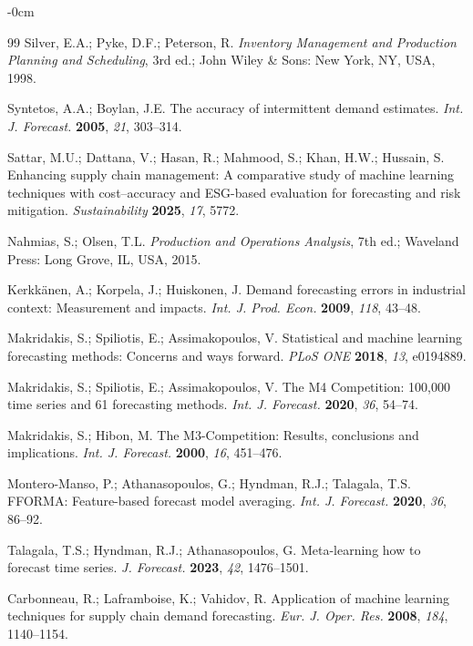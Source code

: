 \documentclass[forecasting,article,submit,pdftex,moreauthors]{Definitions/mdpi}
\begin{document}
\begin{adjustwidth}{-\extralength}{0cm}
\begin{thebibliography}{99}
Silver, E.A.; Pyke, D.F.; Peterson, R. \textit{Inventory Management and Production Planning and Scheduling}, 3rd ed.; John Wiley \& Sons: New York, NY, USA, 1998.

Syntetos, A.A.; Boylan, J.E. The accuracy of intermittent demand estimates. \textit{Int. J. Forecast.} \textbf{2005}, \textit{21}, 303--314.

Sattar, M.U.; Dattana, V.; Hasan, R.; Mahmood, S.; Khan, H.W.; Hussain, S. Enhancing supply chain management: A comparative study of machine learning techniques with cost--accuracy and ESG-based evaluation for forecasting and risk mitigation. \textit{Sustainability} \textbf{2025}, \textit{17}, 5772.

Nahmias, S.; Olsen, T.L. \textit{Production and Operations Analysis}, 7th ed.; Waveland Press: Long Grove, IL, USA, 2015.

Kerkk\"{a}nen, A.; Korpela, J.; Huiskonen, J. Demand forecasting errors in industrial context: Measurement and impacts. \textit{Int. J. Prod. Econ.} \textbf{2009}, \textit{118}, 43--48.

Makridakis, S.; Spiliotis, E.; Assimakopoulos, V. Statistical and machine learning forecasting methods: Concerns and ways forward. \textit{PLoS ONE} \textbf{2018}, \textit{13}, e0194889.

Makridakis, S.; Spiliotis, E.; Assimakopoulos, V. The M4 Competition: 100,000 time series and 61 forecasting methods. \textit{Int. J. Forecast.} \textbf{2020}, \textit{36}, 54--74.

Makridakis, S.; Hibon, M. The M3-Competition: Results, conclusions and implications. \textit{Int. J. Forecast.} \textbf{2000}, \textit{16}, 451--476.

Montero-Manso, P.; Athanasopoulos, G.; Hyndman, R.J.; Talagala, T.S. FFORMA: Feature-based forecast model averaging. \textit{Int. J. Forecast.} \textbf{2020}, \textit{36}, 86--92.

Talagala, T.S.; Hyndman, R.J.; Athanasopoulos, G. Meta-learning how to forecast time series. \textit{J. Forecast.} \textbf{2023}, \textit{42}, 1476--1501.

Carbonneau, R.; Laframboise, K.; Vahidov, R. Application of machine learning techniques for supply chain demand forecasting. \textit{Eur. J. Oper. Res.} \textbf{2008}, \textit{184}, 1140--1154.


\end{thebibliography}
\end{adjustwidth}
\end{document}
